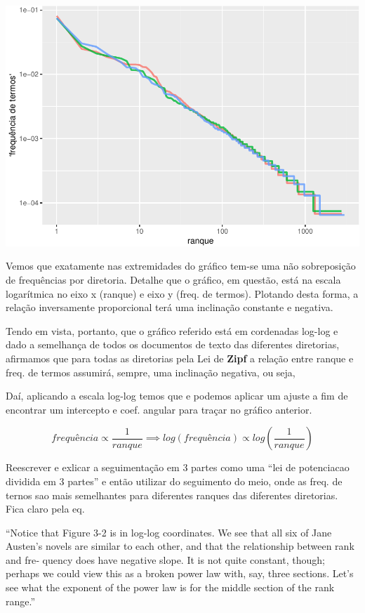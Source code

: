\documentclass[]{article}
\begin{document}
\includegraphics{markdown_v42_files/figure-latex/unnamed-chunk-32-1.pdf}

Vemos que exatamente nas extremidades do gráfico tem-se uma não
sobreposição de frequências por diretoria. Detalhe que o gráfico, em
questão, está na escala logarítmica no eixo x (ranque) e eixo y (freq.
de termos). Plotando desta forma, a relação inversamente proporcional
terá uma inclinação constante e negativa.

Tendo em vista, portanto, que o gráfico referido está em cordenadas
log-log e dado a semelhança de todos os documentos de texto das
diferentes diretorias, afirmamos que para todas as diretorias pela Lei
de \textbf{Zipf} a relação entre ranque e freq. de termos assumirá,
sempre, uma inclinação negativa, ou seja,

Daí, aplicando a escala log-log temos que e podemos aplicar um ajuste a
fim de encontrar um intercepto e coef. angular para traçar no gráfico
anterior.

\[
frequência \propto \frac{1}{ranque} \implies log(frequência) \propto log\left(\frac{1}{ranque}\right)
\]

Reescrever e exlicar a seguimentação em 3 partes como uma ``lei de
potenciacao dividida em 3 partes'' e então utilizar do seguimento do
meio, onde as freq. de ternos sao mais semelhantes para diferentes
ranques das diferentes diretorias. Fica claro pela eq.

``Notice that Figure 3-2 is in log-log coordinates. We see that all six
of Jane Austen's novels are similar to each other, and that the
relationship between rank and fre‐ quency does have negative slope. It
is not quite constant, though; perhaps we could view this as a broken
power law with, say, three sections. Let's see what the exponent of the
power law is for the middle section of the rank range.''
\end{document}
